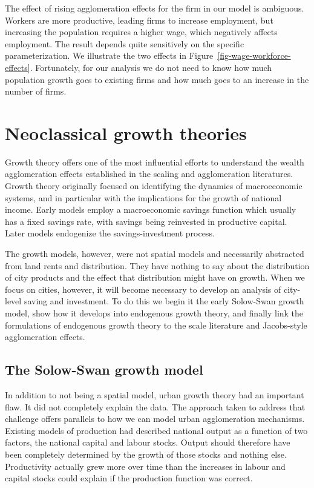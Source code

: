 The effect of rising agglomeration effects for the firm in our model is ambiguous. Workers are more productive, leading firms to increase employment, but increasing the population requires a higher wage, which negatively affects employment. The result depends quite sensitively on the specific parameterization. We illustrate the two effects in Figure~\ref{fig-wage-workforce-effects}. Fortunately, for our analysis we do not need to know how much population growth goes to existing firms and how much goes to an increase in the number of firms.


\section{Neoclassical growth theories}  \label{section-growth}

Growth theory offers one of the most influential efforts to understand the wealth agglomeration effects established in the scaling and agglomeration literatures.  Growth theory originally focused on identifying the dynamics of macroeconomic systems, and in particular with the implications for the growth of national income. Early models \cite{keynesGeneralTheoryEmployment1937, harrodEssayDynamicTheory1939, domarCapitalExpansionRate1946}  employ a macroeconomic savings function which usually has a fixed savings rate, with savings being reinvested in productive capital. Later models endogenize the savings-investment process. 

The growth models, however, were not spatial models and necessarily abstracted from land rents and distribution. They have nothing to say about the distribution of city products and the effect that distribution might have on growth. When we focus on cities, however, it will become necessary to develop an analysis of city-level saving and investment. To do this we begin it the early Solow-Swan growth model, show how it develops into endogenous growth theory, and finally link the formulations of endogenous growth theory to the scale literature and Jacobs-style agglomeration effects.


\subsection{The Solow-Swan growth model}

In addition to not being a spatial model, urban growth theory had an important flaw. It did not completely explain the data. %
The approach taken to address that challenge offers parallels to how we can model urban agglomeration mechanisms.
Existing models of production had described national output as a function of two factors, the national capital and labour stocks. Output should therefore have been completely determined by the growth of those stocks and nothing else. Productivity actually grew more over time than the increases in labour and capital stocks could explain if the production function was correct.

